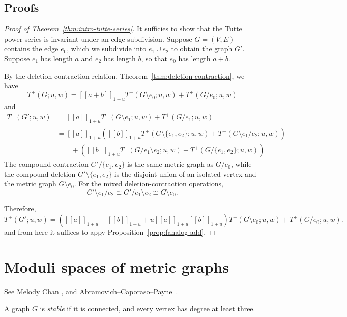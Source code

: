 \documentclass{amsart}
\theoremstyle{definition}
\newcommand{\fanalog}[2]{[\![#2]\!]_{#1}}
\begin{document}
\subsection{Proofs}

\begin{proof}[Proof of Theorem~\ref{thm:intro-tutte-series}]
It sufficies to show that the Tutte power series is invariant 
under an edge subdivision.
Suppose $G = (V,E)$ contains the edge $e_0$, which we subdivide into $e_1 \cup e_2$ to obtain the graph $G'$.
Suppose $e_1$ has length $a$ and $e_2$ has length $b$, so that $e_0$ has length $a + b$.

By the deletion-contraction relation, Theorem~\ref{thm:deletion-contraction},
we have
\[
	T^+(G; u,w) = \fanalog{1 + u}{a + b} T^+(G\setminus e_0; u,w) + T^+(G/e_0; u,w)
\]
and 
\begin{align*}
	T^+(G'; u,w) &= \fanalog{1 + u}{a} T^+(G\setminus e_1; u,w) + T^+(G/e_1; u,w)\\
	&= \fanalog{1 + u}{a}\left(\fanalog{1 + u}{b} T^+(G\setminus\{e_1,e_2\}; u,w) + T^+(G \setminus e_1 / e_2; u,w)\right) \\
	&\qquad + \left(\fanalog{1 + u}{b} T^+(G/e_1 \setminus e_2; u,w) + T^+(G/\{e_1,e_2\}; u,w) \right)
\end{align*}
The compound contraction $G' / \{e_1, e_2\}$ is the same metric graph as $G / e_0$,
while the compound deletion $G' \setminus \{e_1, e_2\}$ is the disjoint union of an isolated vertex and the metric graph $G \setminus e_0$.
For the mixed deletion-contraction operations, 
\[
	G' \setminus e_1 / e_2 \cong G' / e_1 \setminus e_2 \cong G \setminus e_0.
\]

Therefore, 
\[
	T^+(G'; u,w) = (\fanalog{1 + u}{a} + \fanalog{1 + u}{b} + u\fanalog{1 + u}{a}\fanalog{1 + u}{b}) T^+(G\setminus e_0; u,w) + T^+(G/e_0; u,w) .
\]
and from here it suffices to appy Proposition~\ref{prop:fanalog-add}.
\end{proof}

\section{Moduli spaces of metric graphs}
See Melody Chan \cite{Cha},
and Abramovich--Caporaso--Payne~\cite{ACP}.

A graph $G$ is {\em stable} if it is connected, and every vertex has degree at least three.
 
\end{document}
